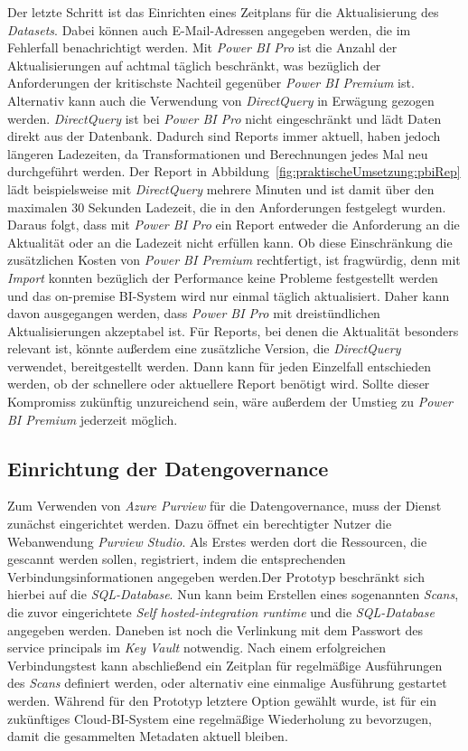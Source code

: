 Der letzte Schritt ist das Einrichten eines Zeitplans für die Aktualisierung des \textit{Datasets}. Dabei können auch E-Mail-Adressen angegeben werden, die im Fehlerfall benachrichtigt werden. Mit \textit{Power BI Pro} ist die Anzahl der Aktualisierungen auf achtmal täglich beschränkt, was bezüglich der Anforderungen der kritischste Nachteil gegenüber \textit{Power BI Premium} ist. Alternativ kann auch die Verwendung von \textit{DirectQuery} in Erwägung gezogen werden. \textit{DirectQuery} ist bei \textit{Power BI Pro} nicht eingeschränkt und lädt Daten direkt aus der Datenbank. Dadurch sind Reports immer aktuell, haben jedoch längeren Ladezeiten, da Transformationen und Berechnungen jedes Mal neu durchgeführt werden. Der Report in Abbildung~\ref{fig:praktischeUmsetzung:pbiRep} lädt beispielsweise mit \textit{DirectQuery} mehrere Minuten und ist damit über den maximalen 30 Sekunden Ladezeit, die in den Anforderungen festgelegt wurden. Daraus folgt, dass mit \textit{Power BI Pro} ein Report entweder die Anforderung an die Aktualität oder an die Ladezeit nicht erfüllen kann. Ob diese Einschränkung die zusätzlichen Kosten von \textit{Power BI Premium} rechtfertigt, ist fragwürdig, denn mit \textit{Import} konnten bezüglich der Performance keine Probleme festgestellt werden und das on-premise BI-System wird nur einmal täglich aktualisiert. Daher kann davon ausgegangen werden, dass \textit{Power BI Pro} mit dreistündlichen Aktualisierungen akzeptabel ist. Für Reports, bei denen die Aktualität besonders relevant ist, könnte außerdem eine zusätzliche Version, die \textit{DirectQuery} verwendet, bereitgestellt werden. Dann kann für jeden Einzelfall entschieden werden, ob der schnellere oder aktuellere Report benötigt wird. Sollte dieser Kompromiss zukünftig unzureichend sein, wäre außerdem der Umstieg zu \textit{Power BI Premium} jederzeit möglich.

\cite[vgl.][]{pearson_pro_2020}

\subsection{Einrichtung der Datengovernance}
Zum Verwenden von \textit{Azure Purview} für die Datengovernance, muss der Dienst zunächst eingerichtet werden. Dazu öffnet ein berechtigter Nutzer die Webanwendung \textit{Purview Studio}. Als Erstes werden dort die Ressourcen, die gescannt werden sollen, registriert, indem die entsprechenden Verbindungsinformationen angegeben werden.Der Prototyp beschränkt sich hierbei auf die \textit{SQL-Database}. Nun kann beim Erstellen eines sogenannten \textit{Scans}, die zuvor eingerichtete \textit{Self hosted-integration runtime} und die \textit{SQL-Database} angegeben werden. Daneben ist noch die Verlinkung mit dem Passwort des service principals im \textit{Key Vault} notwendig. Nach einem erfolgreichen Verbindungstest kann abschließend ein Zeitplan für regelmäßige Ausführungen des \textit{Scans} definiert werden, oder alternativ eine einmalige Ausführung gestartet werden. Während für den Prototyp letztere Option gewählt wurde, ist für ein zukünftiges Cloud-BI-System eine regelmäßige Wiederholung zu bevorzugen, damit die gesammelten Metadaten aktuell bleiben. 

